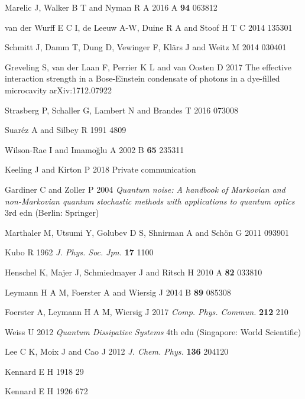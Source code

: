 \documentclass[12pt, a4paper]{iopart}
\begin{document}
\begin{thebibliography}{84}
Marelic J, Walker B T and Nyman R A 2016 \PR A {\bf 94} 063812

van der Wurff E C I, de Leeuw A-W, Duine R A and Stoof H T C 2014  135301

Schmitt J, Damm T, Dung D, Vewinger F, Kl\"ars J and Weitz M 2014  030401

Greveling S, van der Laan F, Perrier K L and van Oosten D 2017 The effective interaction strength in a Bose-Einstein condensate of photons in a dye-filled microcavity arXiv:1712.07922

Strasberg P, Schaller G, Lambert N and Brandes T 2016  073008

Suar\'ez A and Silbey R 1991  4809

Wilson-Rae I and Imamo\u{g}lu A 2002 \PR B {\bf 65} 235311

Keeling J and Kirton P 2018 Private communication

Gardiner C and Zoller P 2004
{\it Quantum noise: A handbook of Markovian and non-Markovian quantum stochastic methods with applications to quantum optics} 3rd edn (Berlin: Springer)

Marthaler M, Utsumi Y, Golubev D S, Shnirman A and Sch\"on G 2011  093901

Kubo R 1962 {\it J. Phys. Soc. Jpn.} {\bf 17} 1100

Henschel K, Majer J, Schmiedmayer J and Ritsch H 2010 \PR A {\bf 82} 033810

Leymann H A M, Foerster A and Wiersig J 2014 \PR B {\bf 89} 085308

Foerster A, Leymann H A M, Wiersig J 2017 {\it Comp. Phys. Commun.} {\bf 212} 210

Weiss U 2012 {\it Quantum Dissipative Systems} 4th edn (Singapore: World Scientific)

Lee C K, Moix J and Cao J 2012 {\it J. Chem. Phys.} {\bf 136} 204120

Kennard E H 1918  29

Kennard E H 1926  672


\end{thebibliography}
\end{document}
